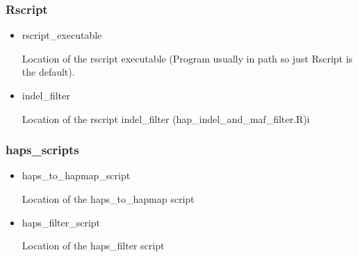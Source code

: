 \documentclass[a4paper,10pt]{article}
\begin{document}
                             \subsubsection{Rscript}
                             \begin{itemize}
                             \item rscript\_executable

                             Location of the rscript executable (Program usually in path so just Rscript is the default).
                             \item indel\_filter

                             Location of the rscript indel\_filter (hap\_indel\_and\_maf\_filter.R)i
                             \end{itemize}
                             \subsubsection{haps\_scripts}
                             \begin{itemize}
                             \item haps\_to\_hapmap\_script 

                             Location of the haps\_to\_hapmap script

                             \item haps\_filter\_script

                             Location of the haps\_filter script

                             \end{itemize}
\end{document}
